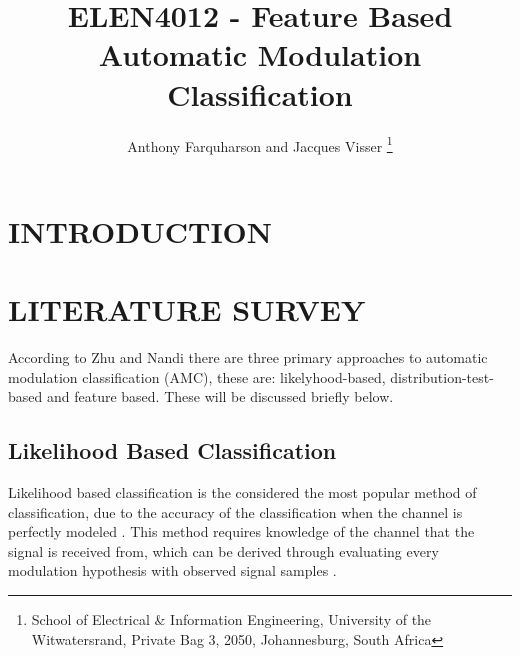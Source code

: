 \documentclass[10pt,twocolumn]{witseiepaper}
\begin{document}
\title{ELEN4012 - Feature Based Automatic Modulation Classification}

\author{Anthony Farquharson and Jacques Visser
\thanks{School of Electrical \& Information Engineering, University of the
Witwatersrand, Private Bag 3, 2050, Johannesburg, South Africa}
}



\maketitle
\thispagestyle{empty}\pagestyle{empty}

\section{INTRODUCTION}

\section{LITERATURE SURVEY}
\label{sec:literature}
According to Zhu and Nandi \cite{zhu2014automatic} there are three primary approaches to automatic modulation classification (AMC), these are: likelyhood-based, distribution-test-based and feature based. These will be discussed briefly below.

	\subsection{Likelihood Based Classification}
	\label{subsec:likelyhood}
	Likelihood based classification is the considered the most popular method of classification, due to the accuracy of the classification when the channel is perfectly modeled \cite{zhu2014automatic}. This method requires knowledge of the channel that the signal is received from, which can be derived through evaluating every modulation hypothesis with observed signal samples \cite{zhu2014automatic}.\\[11pt]
\end{document}
